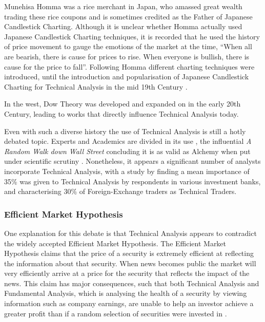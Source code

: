 \documentclass{article}
\theoremstyle{definition}
\begin{document}
Munehisa Homma was a rice merchant in Japan, who amassed great wealth trading these rice coupons and is sometimes credited as the Father of Japanese Candlestick Charting. Although it is unclear whether Homma actually used Japanese Candlestick Charting techniques, it is recorded that he used the history of price movement to gauge the emotions of the market at the time, ``When all are bearish, there is cause for prices to rise. When everyone is bullish, there is cause for the price to fall''. Following Homma different charting techniques were introduced, until the introduction and popularisation of Japanese Candlestick Charting for Technical Analysis in the mid 19th Century \citep[p.18]{jcct1994}.

In the west, Dow Theory was developed and expanded on in the early 20th Century, leading to works \citep{edwards2012technical} that directly influence Technical Analysis today.

Even with such a diverse history the use of Technical Analysis is still a hotly debated topic. Experts and Academics are divided in its use \citep{foundations}, the influential \textit{A Random Walk down Wall Street} concluding it is as valid as Alchemy when put under scientific scrutiny \cite[p.159]{randomwalk2012}. Nonetheless, it appears a significant number of analysts incorporate Technical Analysis, with a study by \cite{examininguse1997} finding a mean importance of 35\% was given to Technical Analysis by respondents in various investment banks, and \cite{cheung2000currency} characterising 30\% of Foreign-Exchange traders as Technical Traders. 

\subsubsection{Efficient Market Hypothesis}

One explanation for this debate is that Technical Analysis appears to contradict the widely accepted Efficient Market Hypothesis. The Efficient Market Hypothesis claims that the price of a security is extremely efficient at reflecting the information about that security. When news becomes public the market will very efficiently arrive at a price for the security that reflects the impact of the news. This claim has major consequences, such that both Technical Analysis and Fundamental Analysis, which is analysing the health of a security by viewing information such as company earnings, are unable to help an investor achieve a greater profit than if a random selection of securities were invested in \citep{emhAndCritics}. 
\end{document}
